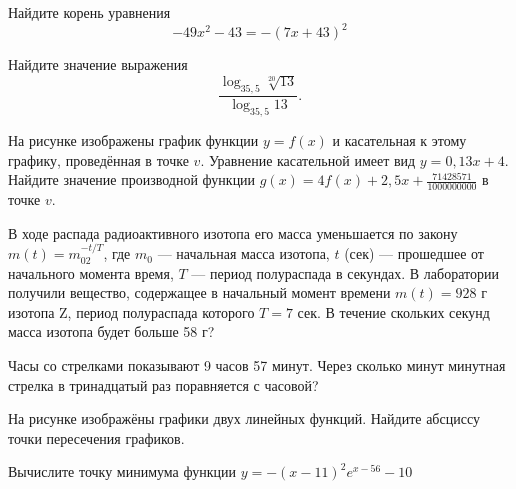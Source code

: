 \documentclass[twocolumn]{article}
\begin{document}
\begin{taskBN}{5}
Найдите корень уравнения $$-49x^2-43=-(7x+43)^2$$
\end{taskBN}

\begin{taskBN}{6}
Найдите значение выражения $$\frac{\log_{35,5}\sqrt[20]{13}}{\log_{35,5}{13}}.$$
\end{taskBN}

\begin{taskBN}{7}
На рисунке изображены график функции $y=f(x)$ и касательная к этому графику, проведённая в точке $v$. Уравнение касательной имеет вид $y= 0{,}13  x+ 4 $. Найдите значение производной функции $g(x) =  4 f(x)+ 2{,}5 x+\frac{71428571}{1000000000}$ в точке $v$.\vspace{2.5cm}
\end{taskBN}

\begin{taskBN}{8}
В ходе распада радиоактивного изотопа его масса уменьшается по закону $m(t) = m_02^{-t/T}$, где $m_0$ — начальная масса изотопа, $t$ (сек) — прошедшее от начального момента время, $T$ — период полураспада в секундах. В лаборатории получили вещество, содержащее в начальный момент времени $m (t) = 928$ г изотопа Z, период полураспада которого $T = 7$ сек. В течение скольких секунд масса изотопа будет больше 58 г?
\end{taskBN}

\begin{taskBN}{9}
Часы со стрелками показывают 9 часов 57 минут. Через сколько минут минутная стрелка в тринадцатый раз поравняется с часовой?
\end{taskBN}

\begin{taskBN}{10}
На рисунке изображёны графики двух линейных функций. Найдите абсциссу точки пересечения графиков.\vspace{2.5cm}
\end{taskBN}

\begin{taskBN}{11}
Вычислите точку минимума функции $y = -(x-11)^{2}e^{x-56}-10$
\end{taskBN}




\cleardoublepage
\def\examvart{Вариант 19.3}
\normalsize

\startpartone
\large
\end{document}
